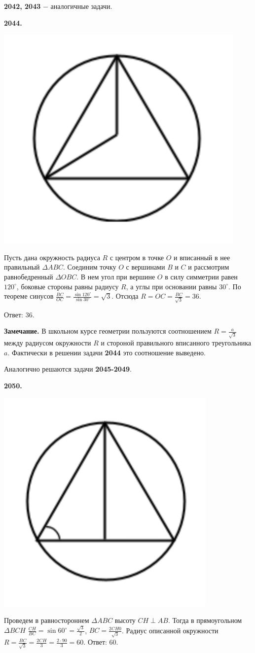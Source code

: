\textbf{2042, 2043} $-$ аналогичные задачи.


\textbf{2044.}

{\centering \includegraphics[width=0.4\linewidth]{Geometry/Content/34.png}
	
}

Пусть дана окружность радиуса $R$ с центром в точке $O$ и  вписанный в нее правильный $\Delta ABC$.  Соединим точку $O$ с вершинами $B$ и $C$ и рассмотрим равнобедренный $\Delta OBC$. В нем угол при вершине $O$ в силу симметрии равен $120^\circ$, боковые стороны равны радиусу $R$, а углы при основании равны $30^\circ$. По теореме синусов $\frac{BC}{OC} = \frac{\sin{120^\circ}}{\sin{30^\circ}} = \sqrt{3}$. Отсюда $R = OC = \frac{BC}{\sqrt{3}} = 36$. 

\null \hspace*{\fill} Ответ: 36.

\textbf{Замечание.} В школьном курсе геометрии пользуются соотношением $R = \frac{a}{\sqrt{3}}$ между радиусом окружности $R$ и стороной правильного вписанного треугольника $a$. Фактически в решении задачи \textbf{2044} это соотношение выведено. 

Аналогично решаются задачи \textbf{2045-2049}.

\textbf{2050.}  

{\centering \includegraphics[width=0.4\linewidth]{Geometry/Content/35.png}
	
}

Проведем в равностороннем $\Delta ABC$ высоту $CH \perp AB$. Тогда в прямоугольном $\Delta BCH$ $\frac{CH}{BC} = \sin{60^\circ} = \frac{\sqrt{3}}{2}$, $BC = \frac{2CH0}{\sqrt{3}}$. Радиус описанной окружности $R = \frac{BC}{\sqrt{3}} = \frac{2CH}{3} = \frac{2\cdot 90}{3} = 60.$ \newline \null \hspace*{\fill} Ответ: 60.

